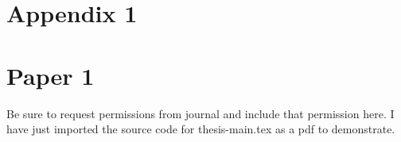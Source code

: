 \documentclass[12pt,openright,twoside]{report} %
\renewcommand{\baselinestretch}{2}	%
\begin{document}
	\renewcommand{\baselinestretch}{1.5}\normalsize
	
	\renewcommand{\baselinestretch}{2}\normalsize
	\clearpage
	
	\appendix
	
	\chapter{Appendix 1}
	
	
	\chapter{Paper 1} \label{Appendix 2}
	\newline
	\noindent Be sure to request permissions from journal and include that permission here. I have just imported the source code for thesis-main.tex as a pdf to demonstrate. 
	
	
\end{document}
